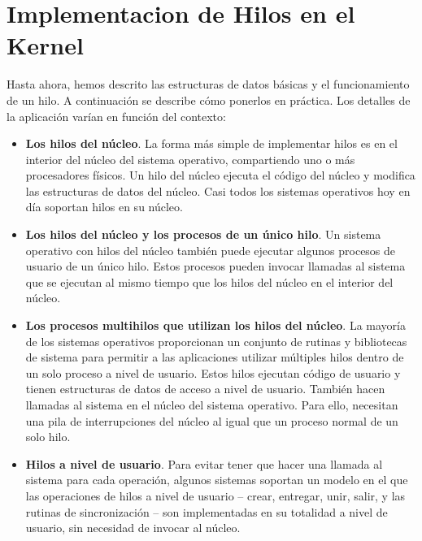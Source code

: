 \documentclass[10pt]{book}
\begin{document}
\section{Implementacion de Hilos en el Kernel}
Hasta ahora, hemos descrito las estructuras de datos básicas y el funcionamiento de un hilo. A continuación se describe cómo ponerlos en práctica. Los detalles de la aplicación varían en función del contexto:
\begin{itemize}
\item \textbf{Los hilos del núcleo}. La forma más simple de implementar hilos es en el interior del núcleo del sistema operativo, compartiendo uno o más procesadores físicos. Un hilo del núcleo ejecuta el código del núcleo y modifica las estructuras de datos del núcleo. Casi todos los sistemas operativos hoy en día soportan hilos en su núcleo.

\item \textbf{Los hilos del núcleo y los procesos de un único hilo}. Un sistema operativo con hilos del núcleo también puede ejecutar algunos procesos de usuario de un único hilo. Estos procesos pueden invocar llamadas al sistema que se ejecutan al mismo tiempo que los hilos del núcleo en el interior del núcleo.

\item \textbf{Los procesos multihilos que utilizan los hilos del núcleo}. La mayoría de los sistemas operativos proporcionan un conjunto de rutinas y bibliotecas de sistema para permitir a las aplicaciones utilizar múltiples hilos dentro de un solo proceso a nivel de usuario. Estos hilos ejecutan código de usuario y tienen estructuras de datos de acceso a nivel de usuario. También hacen llamadas al sistema en el núcleo del sistema operativo. Para ello, necesitan una pila de interrupciones del núcleo al igual que un proceso normal de un solo hilo.

\item \textbf{Hilos a nivel de usuario}. Para evitar tener que hacer una llamada al sistema para cada operación, algunos sistemas soportan un modelo en el que las operaciones de hilos a nivel de usuario -- crear, entregar, unir, salir, y las rutinas de sincronización -- son implementadas en su totalidad a nivel de usuario, sin necesidad de invocar al núcleo.
\end{itemize}
\end{document}
